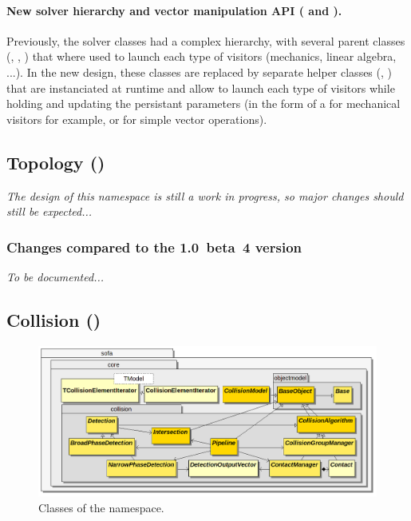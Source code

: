\begin{itemize}
\begin{itemize}
\paragraph{New solver hierarchy and vector manipulation API ( and ).}
Previously, the solver classes had a complex hierarchy, with several parent classes (, , ) that where used to launch each type of visitors (mechanics, linear algebra, ...).
In the new design, these classes are replaced by separate helper classes (, ) that are instanciated at runtime and allow to launch each type of visitors while holding and updating the persistant parameters (in the form of a  for mechanical visitors for example, or  for simple vector operations).


\subsection{Topology ()}

\textit{The design of this namespace is still a work in progress, so major changes should still be expected...}

\subsubsection{Changes compared to the 1.0~beta~4 version}

\textit{To be documented...}

\subsection{Collision ()}

\begin{figure}[h]
\centering
\includegraphics[scale=.33]{../classdiagrams/sofacore-collision.png}
\caption{Classes of the  namespace.}
\label{fig:uml-sofa-core-collision}
\end{figure}


\end{itemize}
\end{itemize}
